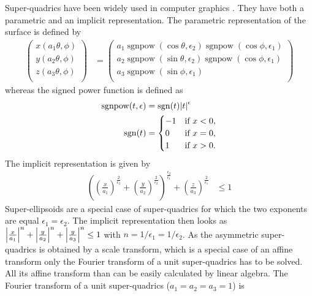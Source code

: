Super-quadrics have been widely used in computer graphics \cite{Barr1981}. They have both a
parametric and an implicit representation. The parametric representation of the surface is defined by
\begin{align}\label{eq:superquadrics:parametric}
  \left(
    \begin{array}{c}
      x(a_1\theta,\phi) \\
      y(a_2\theta,\phi) \\
      z(a_3\theta,\phi) \\
    \end{array}
  \right)
 &=
 \left(
    \begin{array}{c}
     a_1 \operatorname{sgnpow}(\cos\theta,\epsilon_2)\operatorname{sgnpow}(\cos\phi,\epsilon_1)  \\
     a_2 \operatorname{sgnpow}(\sin\theta,\epsilon_2)\operatorname{sgnpow}(\cos\phi,\epsilon_1)  \\
     a_3 \operatorname{sgnpow}(\sin\phi,\epsilon_1) \\
    \end{array}
  \right)
\end{align}
whereas the signed power function is defined as
\begin{align}\label{eq:sgnpow}
  \operatorname{sgnpow}(t,\epsilon) &= \operatorname{sgn}(t)\abs{t}^\epsilon \\
  \operatorname{sgn}(t) &=
  \begin{cases}
    -1&{\text{if }}x<0,\\
     0&{\text{if }}x=0,\\
     1&{\text{if }}x>0.
  \end{cases}
\end{align}
The implicit representation is given by
\begin{align}\label{eq:superquadrics:implicit}
\left(
     \left(\frac{x}{a_1}\right)^{\frac{2}{\epsilon_2}}+
     \left(\frac{y}{a_2}\right)^{\frac{2}{\epsilon_2}}
\right)^{\frac{\epsilon_2}{\epsilon_1}} +
\left(\frac{z}{a_3}\right)^{\frac{2}{\epsilon_1}} &\leq 1
\end{align}
Super-ellipsoids are a special case of super-quadrics for which the two exponents are equal $\epsilon_1=\epsilon_2$. The implicit representation then looks as
$\abs{\frac{x}{a_1}}^n+\abs{\frac{y}{a_2}}^n+\abs{\frac{y}{a_3}}^n\leq 1$ with $n=1/\epsilon_1=1/\epsilon_2$.
As the asymmetric super-quadrics is obtained by a scale transform, which is a special case of an affine transform only the Fourier transform of a unit super-quadrics has to be solved. All its affine transform than can be easily calculated by linear algebra.  The Fourier transform of a unit super-quadrics ($a_1=a_2=a_3=1$) is
